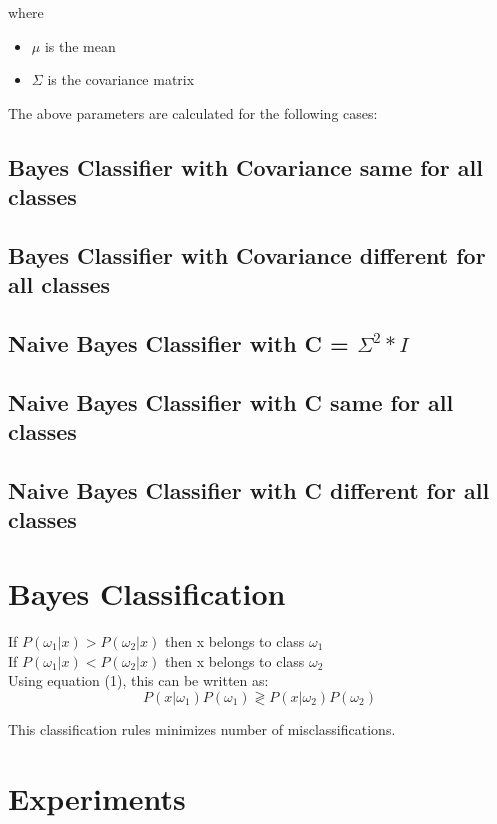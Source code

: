 \documentclass[11pt,a4paper]{article}
\begin{document}
 where
 \begin{itemize}
 	\item $\mu$ is the mean 
 	\item $\Sigma$ is the covariance matrix
 \end{itemize}
 
 The above parameters are calculated for the following cases:
 \subsection{Bayes Classifier with Covariance same for all classes}
 \subsection{Bayes Classifier with Covariance different for all classes}
 \subsection{Naive Bayes Classifier with C = $\Sigma^2*I$}
 \subsection{Naive Bayes Classifier with C same for all classes}
 \subsection{Naive Bayes Classifier with C different for all classes} 

\section{Bayes Classification}

If $P(\omega_1 | x) > P(\omega_2 | x)$ then x belongs to class $\omega_1$
\\If $P(\omega_1 | x) < P(\omega_2 | x)$ then x belongs to class $\omega_2$\\

Using equation (1), this can be written as:
 \begin{equation}
 {P(x| \omega_1)P(\omega_1) \gtrless P(x | \omega_2)P(\omega_2)}
 \end{equation}

This classification rules minimizes number of misclassifications. 

\clearpage
\section{Experiments}
\end{document}
